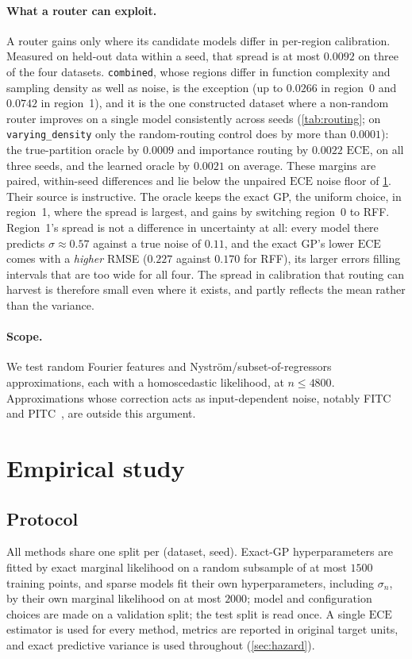 \documentclass[11pt]{article}
\newcommand{\ece}{\mathrm{ECE}}
\begin{document}
\paragraph{What a router can exploit.} A router gains only where its candidate models
differ in per-region calibration. Measured on held-out data within a seed, that spread
is at most $0.0092$ on three of the four datasets. \texttt{combined}, whose regions
differ in function complexity and sampling density as well as noise, is the exception
(up to $0.0266$ in region~0 and $0.0742$ in region~1), and it is the one constructed
dataset where a non-random router improves on a single model consistently across
seeds (\cref{tab:routing}; on \texttt{varying\_density} only the random-routing
control does by more than $0.0001$): the true-partition oracle by $0.0009$ and
importance routing by $0.0022$ $\ece$, on all three seeds, and the learned oracle by
$0.0021$ on average. These margins are paired, within-seed differences and lie below
the unpaired $\ece$ noise floor of \cref{sec:empirical}. Their source is instructive.
The oracle keeps the exact GP, the uniform choice, in region~1, where the spread is
largest, and gains by switching region~0 to RFF. Region~1's spread is not a difference
in uncertainty at all: every model there predicts $\sigma\approx0.57$ against a true
noise of $0.11$, and the exact GP's lower $\ece$ comes with a \emph{higher} RMSE
($0.227$ against $0.170$ for RFF), its larger errors filling intervals that are too
wide for all four. The spread in calibration that routing can harvest is therefore
small even where it exists, and partly reflects the mean rather than the variance.

\paragraph{Scope.} We test random Fourier features and Nystr\"om/subset-of-regressors
approximations, each with a homoscedastic likelihood, at $n\le4800$. Approximations
whose correction acts as input-dependent noise, notably FITC~\citep{snelson2006} and
PITC~\citep{quinonero2005}, are outside this argument.

\section{Empirical study}
\label{sec:empirical}

\subsection{Protocol}
All methods share one split per (dataset, seed). Exact-GP hyperparameters are fitted
by exact marginal likelihood on a random subsample of at most $1500$ training points,
and sparse models fit their own hyperparameters, including $\sigma_n$, by their own
marginal likelihood on at most $2000$; model and configuration choices are made on a
validation split; the test split is read once. A
single $\ece$ estimator is used for every method, metrics are reported in original
target units, and exact predictive variance is used throughout (\cref{sec:hazard}).
\end{document}

